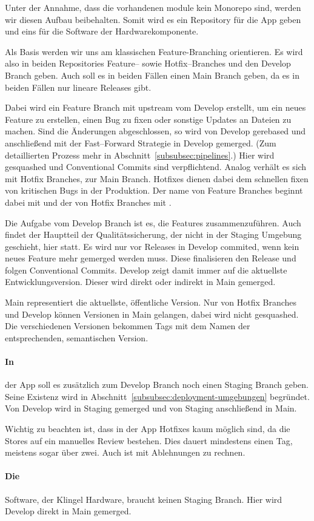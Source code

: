 Unter der Annahme, dass die vorhandenen module kein Monorepo sind, werden wir diesen Aufbau beibehalten.
Somit wird es ein Repository für die App geben und eins für die Software der Hardwarekomponente.


Als Basis werden wir uns am klassischen Feature-Branching orientieren.
Es wird also in beiden Repositories Feature-- sowie Hotfix--Branches und den Develop Branch geben.
Auch soll es in beiden Fällen einen Main Branch geben, da es in beiden Fällen nur lineare Releases gibt.


Dabei wird ein Feature Branch mit upstream vom Develop erstellt, um ein neues Feature zu erstellen, einen Bug zu fixen oder sonstige Updates an Dateien zu machen.
Sind die Änderungen abgeschlossen, so wird von Develop gerebased und anschließend mit der Fast--Forward Strategie in Develop gemerged.
(Zum detaillierten Prozess mehr in Abschnitt~\ref{subsubsec:pipelines}.)
Hier wird gesquashed und Conventional Commits sind verpflichtend.
Analog verhält es sich mit Hotfix Branches, zur Main Branch.
Hotfixes dienen dabei dem schnellen fixen von kritischen Bugs in der Produktion.
Der name von Feature Branches beginnt dabei mit  und der von Hotfix Branches mit .


Die Aufgabe vom Develop Branch ist es, die Features zusammenzuführen.
Auch findet der Hauptteil der Qualitätssicherung, der nicht in der Staging Umgebung geschieht, hier statt.
Es wird nur vor Releases in Develop commited, wenn kein neues Feature mehr gemerged werden muss.
Diese finalisieren den Release und folgen Conventional Commits.
Develop zeigt damit immer auf die aktuellste Entwicklungsversion.
Dieser wird direkt oder indirekt in Main gemerged.


Main representiert die aktuellste, öffentliche Version.
Nur von Hotfix Branches und Develop können Versionen in Main gelangen, dabei wird nicht gesquashed.
Die verschiedenen Versionen bekommen Tags mit dem Namen der entsprechenden, semantischen Version.


\paragraph{\large{In}} der App soll es zusätzlich zum Develop Branch noch einen Staging Branch geben.
    Seine Existenz wird in Abschnitt~\ref{subsubsec:deployment-umgebungen} begründet.
    Von Develop wird in Staging gemerged und von Staging anschließend in Main.


    Wichtig zu beachten ist, dass in der App Hotfixes kaum möglich sind, da die Stores auf ein manuelles Review bestehen.
    Dies dauert mindestens einen Tag, meistens sogar über zwei.
    Auch ist mit Ablehnungen zu rechnen.


\paragraph{\large{Die}} Software, der Klingel Hardware, braucht keinen Staging Branch.
    Hier wird Develop direkt in Main gemerged.